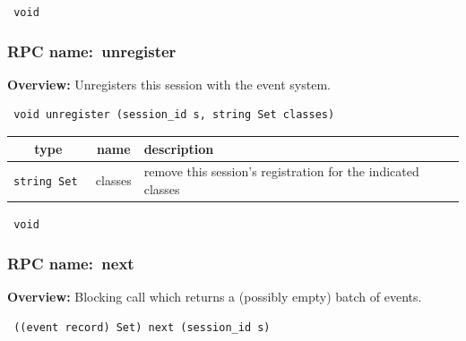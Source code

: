 \vspace{0.3cm}

{\tt 
void
}



\vspace{0.3cm}
\vspace{0.3cm}
\vspace{0.3cm}
\subsubsection{RPC name:~unregister}

{\bf Overview:} 
Unregisters this session with the event system.

\begin{verbatim} void unregister (session_id s, string Set classes)\end{verbatim}



 
\vspace{0.3cm}
\begin{tabular}{|c|c|p{7cm}|}
 \hline
{\bf type} & {\bf name} & {\bf description} \\ \hline
{\tt string Set } & classes & remove this session's registration for the indicated classes \\ \hline 

\end{tabular}

\vspace{0.3cm}

{\tt 
void
}



\vspace{0.3cm}
\vspace{0.3cm}
\vspace{0.3cm}
\subsubsection{RPC name:~next}

{\bf Overview:} 
Blocking call which returns a (possibly empty) batch of events.

\begin{verbatim} ((event record) Set) next (session_id s)\end{verbatim}


\vspace{0.3cm}

